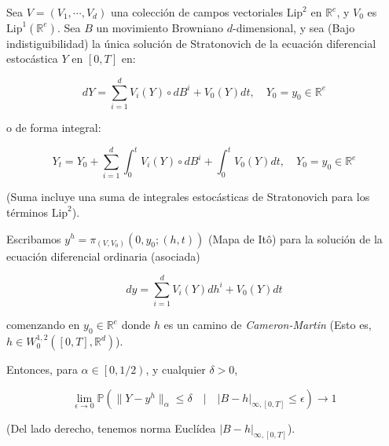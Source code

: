 \begin{theorem}
	Sea $V = \left( V_1, \cdots, V_d \right)$ una colección de campos vectoriales $\text{Lip}^2$ en $\mathbb{R}^e$, y $V_0$ es $\text{Lip}^1 (\mathbb{R}^e)$. Sea $B$ un movimiento Browniano $d$-dimensional, y sea (Bajo indistiguibilidad) la única solución de Stratonovich de la ecuación diferencial estocástica $Y$ en $[0,T]$ en:

	\[
		dY = \sum_{i = 1}^d V_i(Y) \circ dB^i + V_0 (Y) dt, \quad Y_0 = y_0 \in \mathbb{R}^e
	\]

	o de forma integral:

	\[
		Y_t = Y_0 + \sum_{i = 1}^d  \int_0^t V_i(Y) \circ dB^i + \int_0^t V_0 (Y) dt, \quad Y_0 = y_0 \in \mathbb{R}^e
	\]

	(Suma incluye una suma de integrales estocásticas de Stratonovich para los términos $\text{Lip}^2$).

	Escribamos $y^h = \pi_{(V, V_0)} (0, y_0; (h,t))$ (Mapa de Itô) para la solución de la ecuación diferencial ordinaria (asociada)

	\[
		dy = \sum_{i = 1}^d V_i (Y) dh^i + V_0 (Y) dt
	\]

	comenzando en $y_0 \in \mathbb{R}^e$ donde $h$ es un camino de \textit{Cameron-Martin} (Esto es, $h \in W_0^{1,2} ([0,T], \mathbb{R}^d)$).

	Entonces, para $\alpha \in \left[ 0, 1/2 \right)$, y cualquier $\delta > 0$,

	\[
		\lim_{\epsilon \rightarrow 0} \mathbb{P} \left( \lVert Y - y^h \rVert_{ \alpha }  \leq \delta \quad \vert \quad \lvert B - h \rvert_{\infty, [0,T]}  \leq \epsilon \right) \rightarrow 1
	\]

	(Del lado derecho, tenemos norma Euclídea $\lvert B - h \rvert_{\infty, [0,T]} $).

\end{theorem}

